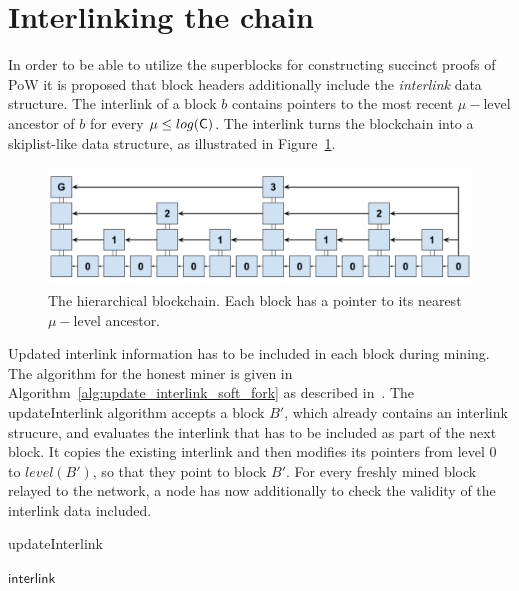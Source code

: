 \section{Interlinking the chain}
In order to be able to utilize the superblocks for constructing succinct proofs of PoW it is proposed that block headers additionally include the \emph{interlink} data structure. The interlink of a block $b$ contains pointers to the most recent $\mu-$level ancestor of $b$ for every $\mu \leq log(\mathsf{C})$. The interlink turns the blockchain into a skiplist-like data structure, as illustrated in Figure~\ref{fig:hierarchical_ledger}.

\begin{figure}[h!]
	\begin{center}
		\includegraphics[width=0.8\columnwidth]{figures/hierarchical-ledger.pdf}
	\end{center}
	\caption{The hierarchical blockchain. Each block has a pointer to its nearest $\mu-$level ancestor.}
	\label{fig:hierarchical_ledger}
\end{figure}

Updated interlink information has to be included in each block during mining. The algorithm for the honest miner is given in Algorithm~\ref{alg:update_interlink_soft_fork} as described in~\cite{popow}. The updateInterlink algorithm accepts a block $B'$, which already contains an interlink strucure, and evaluates the interlink that has to be included as part of the next block. It copies the existing interlink and then modifies its pointers from level 0 to $level(B')$, so that they point to block $B'$. For every freshly mined block relayed to the network, a node has now additionally to check the validity of the interlink data included. 

\begin{algorithm}[h]
		\caption{\label{alg:update_interlink_soft_fork}updateInterlink~\cite{popow}}
		\begin{algorithmic}[1]
						\EndFor
						\State\Return$\textsf{interlink}$
				\EndFunction
		\end{algorithmic}
\end{algorithm}

